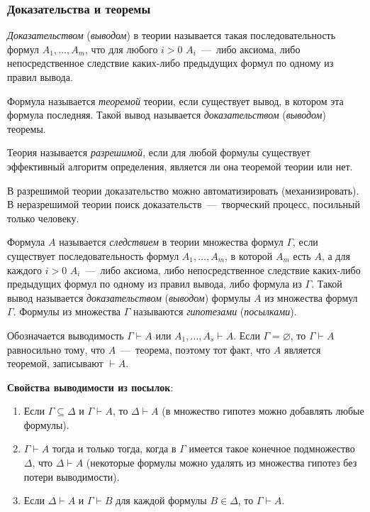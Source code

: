 \subsubsection{Доказательства и теоремы}
\begin{definition*}
    \textit{Доказательством} (\textit{выводом}) в теории называется такая последовательность формул $A_1, \dots, A_m$, что для любого $i  > 0$ $A_i$~---~либо аксиома, либо непосредственное следствие каких-либо предыдущих формул по одному из правил вывода.
\end{definition*}
\begin{definition*}
    Формула называется \textit{теоремой} теории, если существует вывод, в котором эта формула последняя. Такой вывод называется \textit{доказательством} (\textit{выводом}) теоремы. 
\end{definition*}
\begin{definition*}
    Теория называется \textit{разрешимой}, если для любой формулы существует эффективный алгоритм определения, является ли она теоремой теории или нет.
\end{definition*}
В разрешимой теории доказательство можно автоматизировать (механизировать). В неразрешимой теории поиск доказательств~---~творческий процесс, посильный только человеку.
\begin{definition*}
    Формула $A$ называется \textit{следствием} в теории множества формул $\Gamma$, если существует последовательность формул $A_1, \dots, A_m$, в которой $A_m$ есть $A$, а для каждого $i > 0$ $A_i$~---~либо аксиома, либо непосредственное следствие каких-либо предыдущих формул по одному из правил вывода, либо формула из $\Gamma$. Такой вывод называется \textit{доказательством} (\textit{выводом}) формулы $A$ из множества формул $\Gamma$. Формулы из множества $\Gamma$ называются \textit{гипотезами} (\textit{посылками}).
\end{definition*}
Обозначается выводимость $\Gamma \vdash A$ или $A_1, \dots, A_s \vdash A$. Если $\Gamma = \varnothing$, то $\Gamma \vdash A$ равносильно тому, что $A$~---~теорема, поэтому тот факт, что $A$ является теоремой, записывают $\vdash A$.

\textbf{Свойства выводимости из посылок}:
\begin{enumerate}
    \item Если $\Gamma \subseteq \Delta$ и $\Gamma \vdash A$, то $\Delta \vdash A$ (в множество гипотез можно добавлять любые формулы).
    \item $\Gamma \vdash A$ тогда и только тогда, когда в $\Gamma$ имеется такое конечное подмножество $\Delta$, что $\Delta \vdash A$ (некоторые формулы можно удалять из множества гипотез без потери выводимости).
    \item Если $\Delta \vdash A$ и $\Gamma \vdash B$ для каждой формулы $B \in \Delta$, то $\Gamma \vdash A$.
\end{enumerate}